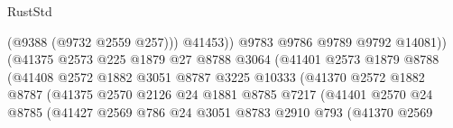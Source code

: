 \begin{lexlean}{RustStd}
\begin{coremodule}
                                                (@9388 (@9732 @2559 @257)))
                                              @41453))
                                          @9783
                                          @9786
                                          @9789
                                          @9792
                                          @14081))
                                      (@41375
                                        @2573
                                        @225
                                        @1879
                                        @27
                                        @8788
                                        @3064
                                        (@41401
                                          @2573
                                          @1879
                                          @8788
                                          (@41408
                                            @2572
                                            @1882
                                            @3051
                                            @8787
                                            @3225
                                            @10333
                                            (@41370
                                              @2572
                                              @1882
                                              @8787
                                              (@41375
                                                @2570
                                                @2126
                                                @24
                                                @1881
                                                @8785
                                                @7217
                                                (@41401
                                                  @2570
                                                  @24
                                                  @8785
                                                  (@41427
                                                    @2569
                                                    @786
                                                    @24
                                                    @3051
                                                    @8783
                                                    @2910
                                                    @793
                                                    (@41370
                                                      @2569

\end{coremodule}
\end{lexlean}
